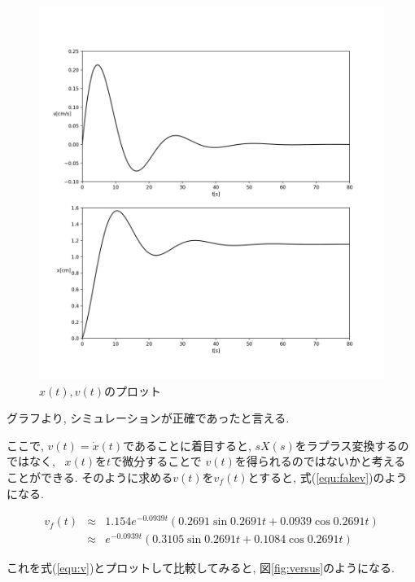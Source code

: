 \documentclass[titlepage]{jsarticle}
\begin{document}
            \begin{figure}[h]
                \centering
                \includegraphics[width=15cm]{img/bmdplt.png}
                \caption{$x(t), v(t)$のプロット}
                \label{fig:bmdplot}
            \end{figure}

            グラフより, シミュレーションが正確であったと言える.

            ここで, $v(t) = \dot{x}(t)$であることに着目すると,
            $sX(s)$をラプラス変換するのではなく, \ $x(t)$を$t$で微分することで
            $v(t)$を得られるのではないかと考えることができる.
            そのように求める$v(t)$を$v_f(t)$とすると, 式(\ref{equ:fakev})のようになる.

            \begin{eqnarray}
                v_f(t) &\approx& 1.154 e^{-0.0939 t} (0.2691 \sin{0.2691 t} + 0.0939 \cos{0.2691 t}) \nonumber \\
                &\approx& e^{-0.0939 t} (0.3105\sin{0.2691t} + 0.1084 \cos{0.2691t}) \label{equ:fakev}
            \end{eqnarray}

            これを式(\ref{equ:v})とプロットして比較してみると,
            図\ref{fig:versus}のようになる.
\end{document}
